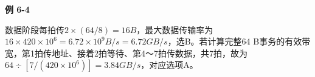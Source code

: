 {\color{ink}\bfseries 例 6-4}\par\vspace{1bp}数据阶段每拍传\(2\times (64/\allowbreak{}8)=\allowbreak{}16 B\)，最大数据传输率为\(16\times 420\times 10^{6}=\allowbreak{}6.72\times 10^{9} B/\allowbreak{}s=\allowbreak{}6.72 GB/\allowbreak{}s\)，选B。若计算完整64 B事务的有效带宽，第1拍传地址、接着2拍等待、第4～7拍传数据，共7拍，故为\(64\div [7/\allowbreak{}(420\times 10^{6})]=\allowbreak{}3.84 GB/\allowbreak{}s\)，对应选项A。

